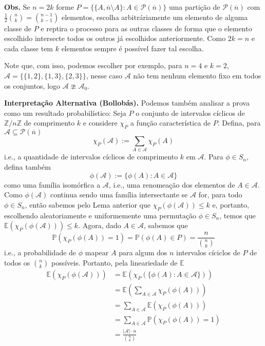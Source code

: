 \documentclass[11pt]{article}
\newcommand{\mc}[1]{\mathcal{#1}}
\newcommand{\mbb}[1]{\mathbb{#1}}
\newcommand{\ol}[1]{\overline{#1}}
\newcommand{\rp}[1]{{\left(#1\right)}}
\newcommand{\cl}[1]{\colorlet{shadecolor}{#1}}
\begin{document}
\cl{purple!15}
\begin{shaded}
\textbf{Obs.}
Se $n=2k$ forme $P=\{\{A,\ol{n}\setminus A\}:A\in\mc{P}(\ol{n})\}$ uma partição de $\mc{P}(\ol{n})$ com $\frac12\binom{n}{k}=\binom{n-1}{k-1}$ elementos, escolha arbitráriamente um elemento de alguma classe de $P$ e reptira o processo para as outras classes de forma que o elemento escolhido intersecte todos os outros já escolhidos anteriormente. Como $2k=n$ e cada classe tem $k$ elementos sempre é possível fazer tal escolha.

Note que, com isso, podemos escolher por exemplo, para $n=4$ e $k=2$, $\mathscr{A}=\{\{1,2\},\{1,3\},\{2,3\}\}$, nesse caso $\mathscr{A}$ não tem nenhum elemento fixo em todos os conjuntos, logo $\mathscr{A}\ncong\mathscr{A}_0$.
\end{shaded}

\begin{shaded}
\textbf{Interpretação Alternativa (Bollobás).} Podemos também analisar a prova como um resultado probabilístico: Seja $P$ o conjunto de intervalos cíclicos de $\mbb{Z}/n\mbb{Z}$ de comprimento $k$ e considere $\chi_P$ a função característica de $P$. Defina, para $\mathscr{A}\subseteq\mc{P}(\ol{n})$
$$\chi_P(\mathscr{A}):=\sum_{A\in\mathscr{A}}\chi_P(A)$$
i.e., a quantidade de intervalos cíclicos de comprimento $k$ em $\mathscr{A}$. Para $\phi\in S_n$, defina também
$$\phi(\mathscr{A}):=\{\phi(A):A\in\mathscr{A}\}$$
como uma família isomórfica a $\mathscr{A}$, i.e., uma renomeação dos elementos de $A\in\mathscr{A}$. Como $\phi(\mathscr{A})$ continua sendo uma família intersectante se $\mathscr{A}$ for, para todo $\phi\in S_n$, então sabemos pelo Lema anterior que $\chi_P(\phi(\mathscr{A}))\leq k$ e, portanto, escolhendo aleatoriamente e uniformemente uma permutação $\phi\in S_n$, temos que $\mbb{E}(\chi_P(\phi(\mathscr{A})))\leq k$. Agora, dado $A\in\mathscr{A}$, sabemos que
$$\mbb{P}(\chi_P(\phi(A))=1)=\mbb{P}(\phi(A)\in P)=\frac{n}{\binom{n}{k}}$$
i.e., a probabilidade de $\phi$ mapear $A$ para algum dos $n$ intervalos cíciclos de $P$ de todos os $\binom{n}{k}$ possíveis. Portanto, pela lineariedade de $\mbb{E}$
\begin{align*}
    \mbb{E}\rp{\chi_P(\phi(\mathscr{A}))} & = \mbb{E}\rp{\chi_P(\{\phi(A):A\in\mathscr{A}\})}\\
    & = \mbb{E}\rp{\sum_{A\in\mathscr{A}}\chi_P(\phi(A))}\\
    & = \sum_{A\in\mathscr{A}}\mbb{E}\rp{\chi_P(\phi(A))}\\
    & = \sum_{A\in\mathscr{A}}\mbb{P}(\chi_P(\phi(A))=1)\\
    & = \frac{|\mathscr{A}|\cdot n}{\binom{n}{k}}
\end{align*}
\end{shaded}
\end{document}
